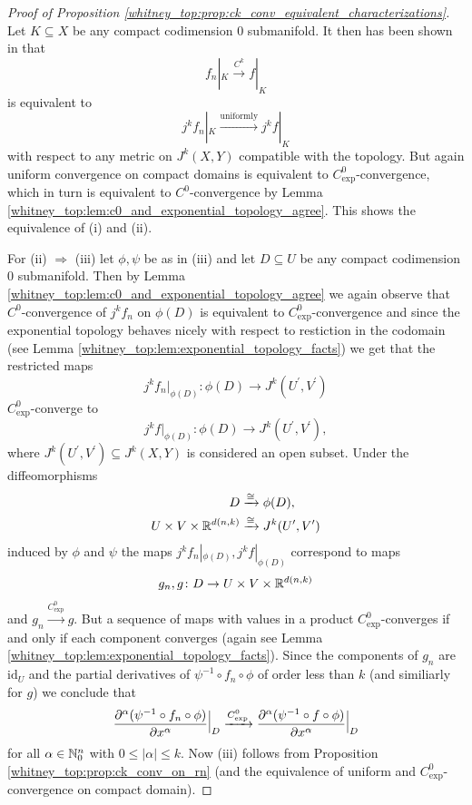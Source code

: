 \begin{proof}[Proof of Proposition \ref{whitney_top:prop:ck_conv_equivalent_characterizations}]
    Let $K \subseteq X$ be any compact codimension $0$ submanifold. It then has been shown in \cite{golubitsky2012stable} that 
    \[
    f_n|_K \xrightarrow{C^k} f|_K
    \]
    is equivalent to 
    \[
    j^kf_n|_K \xrightarrow{\mathrm{uniformly}}j^kf|_K
    \]
    with respect to any metric on $J^k(X,Y)$ compatible with the topology. But again uniform convergence on compact domains is equivalent to $C^0_\mathrm{exp}$-convergence, which in turn is equivalent to $C^0$-convergence by Lemma \ref{whitney_top:lem:c0_and_exponential_topology_agree}. This shows the equivalence of (i) and (ii). 
    
    For (ii) $\Rightarrow$ (iii) let $\phi,\psi$ be as in (iii) and let $D\subseteq U$ be any compact codimension $0$ submanifold. Then by Lemma \ref{whitney_top:lem:c0_and_exponential_topology_agree} we again observe that $C^0$-convergence of $j^kf_n$ on $\phi(D)$ is equivalent to $C^0_\mathrm{exp}$-convergence and since the exponential topology behaves nicely with respect to restiction in the codomain (see Lemma \ref{whitney_top:lem:exponential_topology_facts}) we get that the restricted maps 
    \[
    j^kf_n|_{\phi(D)} \colon \phi(D) \to J^k(U^\prime,V^\prime)
    \]
    $C^0_\mathrm{exp}$-converge to 
    \[
    j^kf|_{\phi(D)} \colon \phi(D) \to J^k(U^\prime,V^\prime),
    \]
    where $J^k(U^\prime,V^\prime) \subseteq J^k(X,Y)$ is considered an open subset. Under the diffeomorphisms
    \begin{align*}
        D &\xrightarrow{\cong} \phi(D), \\
        U \times V \times \mathbb{R}^{d(n,k)} &\xrightarrow{\cong} J^k(U^\prime,V^\prime)
    \end{align*}
    induced by $\phi$ and $\psi$ the maps $j^kf_n|_{\phi(D)}, j^kf|_{\phi(D)}$ correspond to maps 
    \[
    g_n,g \colon D \to U \times V \times \mathbb{R}^{d(n,k)}
    \]
    and $g_n \xrightarrow{C^0_\mathrm{exp}} g$. But a sequence of maps with values in a product $C^0_\mathrm{exp}$-converges if and only if each component converges (again see Lemma \ref{whitney_top:lem:exponential_topology_facts}). Since the components of $g_n$ are $\mathrm{id}_U$ and the partial derivatives of $\psi^{-1} \circ f_n \circ \phi$ of order less than $k$ (and similiarly for $g$) we conclude that 
    \[
    \frac{\partial^\alpha(\psi^{-1} \circ f_n \circ \phi)}{\partial x^\alpha}\scalebox{1}[1.8]{$|$}_D \xrightarrow{C^0_\mathrm{exp}} \frac{\partial^\alpha(\psi^{-1} \circ f \circ \phi)}{\partial x^\alpha}\scalebox{1}[1.8]{$|$}_D
    \]    
    for all $\alpha \in \mathbb{N}_0^n$ with $0 \leq |\alpha| \leq k$. Now (iii) follows from Proposition \ref{whitney_top:prop:ck_conv_on_rn} (and the equivalence of uniform and $C^0_\mathrm{exp}$-convergence on compact domain). 


\end{proof}
